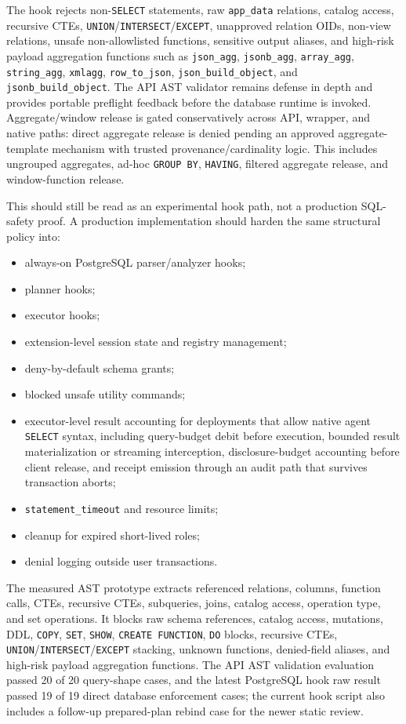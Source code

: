 \documentclass[journal]{IEEEtran}
\providecommand{\tightlist}{%
  \setlength{\itemsep}{0pt}\setlength{\parskip}{0pt}}
\begin{document}
The hook rejects non-\texttt{SELECT} statements, raw
\texttt{app\_data} relations, catalog access, recursive CTEs,
\texttt{UNION}/\texttt{INTERSECT}/\texttt{EXCEPT}, unapproved relation
OIDs, non-view relations, unsafe non-allowlisted functions, sensitive output
aliases, and high-risk payload aggregation functions such as
\texttt{json\_agg}, \texttt{jsonb\_agg}, \texttt{array\_agg},
\texttt{string\_agg}, \texttt{xmlagg}, \texttt{row\_to\_json},
\texttt{json\_build\_object}, and \texttt{jsonb\_build\_object}. The API
AST validator remains defense in depth and provides portable preflight
feedback before the database runtime is invoked. Aggregate/window release is
gated conservatively across API, wrapper, and native paths: direct aggregate
release is denied pending an approved aggregate-template mechanism with trusted
provenance/cardinality logic. This includes ungrouped aggregates, ad-hoc
\texttt{GROUP\ BY}, \texttt{HAVING}, filtered aggregate release, and
window-function release.

This should still be read as an experimental hook path, not a production
SQL-safety proof. A production implementation should harden the same
structural policy into:

\begin{itemize}
\tightlist
\item
  always-on PostgreSQL parser/analyzer hooks;
\item
  planner hooks;
\item
  executor hooks;
\item
  extension-level session state and registry management;
\item
  deny-by-default schema grants;
\item
  blocked unsafe utility commands;
\item
  executor-level result accounting for deployments that allow native
  agent \texttt{SELECT} syntax, including query-budget debit before
  execution, bounded result materialization or streaming interception,
  disclosure-budget accounting before client release, and receipt
  emission through an audit path that survives transaction aborts;
\item
  \texttt{statement\_timeout} and resource limits;
\item
  cleanup for expired short-lived roles;
\item
  denial logging outside user transactions.
\end{itemize}

The measured AST prototype extracts referenced relations, columns,
function calls, CTEs, recursive CTEs, subqueries, joins, catalog access,
operation type, and set operations. It blocks raw schema references,
catalog access, mutations, DDL, \texttt{COPY}, \texttt{SET},
\texttt{SHOW}, \texttt{CREATE\ FUNCTION}, \texttt{DO} blocks, recursive
CTEs, \texttt{UNION}/\texttt{INTERSECT}/\texttt{EXCEPT} stacking,
unknown functions, denied-field aliases, and high-risk payload
aggregation functions. The API AST validation evaluation passed 20 of 20
query-shape cases, and the latest PostgreSQL hook raw result passed 19 of 19
direct database enforcement cases; the current hook script also includes a
follow-up prepared-plan rebind case for the newer static review.
\end{document}
